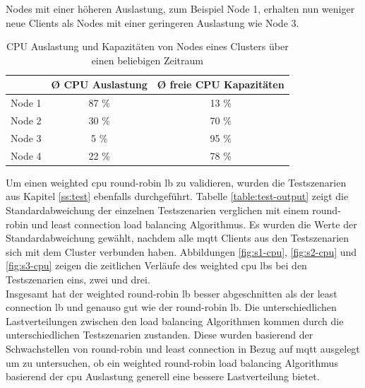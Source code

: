 Nodes mit einer höheren Auslastung, zum Beispiel Node 1, erhalten nun weniger neue Clients als Nodes mit einer geringeren Auslastung wie Node 3.
\\
\begin{table}[h!]
\centering
\renewcommand{\arraystretch}{1.5}
\begin{tabular}{|l|c|c|}
    \hline
    & \textbf{Ø CPU Auslastung} & \textbf{Ø freie CPU Kapazitäten} \\
    \hline
    \hline
    Node 1 & 87 \% & 13 \% \\
    \hline
    Node 2 & 30 \% & 70 \% \\
    \hline
    Node 3 & 5 \% & 95 \% \\
    \hline
    Node 4 & 22 \% & 78 \% \\
    \hline
\end{tabular}
\caption{CPU Auslastung und Kapazitäten von Nodes eines Clusters über einen beliebigen Zeitraum}
\label{table:example-cluster-cpu}
\end{table}
Um einen weighted \ac{cpu} round-robin \acl{lb} zu validieren, wurden die Testszenarien aus Kapitel \ref{ss:test} ebenfalls durchgeführt.
Tabelle \ref{table:test-output} zeigt die Standardabweichung der einzelnen Testszenarien verglichen mit einem round-robin und least connection load balancing Algorithmus.
Es wurden die Werte der Standardabweichung gewählt, nachdem alle \ac{mqtt} Clients aus den Testszenarien sich mit dem Cluster verbunden haben.
Abbildungen \ref{fig:s1-cpu}, \ref{fig:s2-cpu} und \ref{fig:s3-cpu} zeigen die zeitlichen Verläufe des weighted \ac{cpu} \aclp{lb} bei den Testszenarien eins, zwei und drei.
\\
Insgesamt hat der weighted round-robin \ac{lb} besser abgeschnitten als der least connection \ac{lb} und genauso gut wie der round-robin \ac{lb}. Die unterschiedlichen Lastverteilungen zwischen den load balancing Algorithmen kommen durch die unterschiedlichen Testszenarien zustanden. Diese wurden basierend der Schwachstellen von round-robin und least connection in Bezug auf \ac{mqtt} ausgelegt um zu untersuchen, ob ein weighted round-robin load balancing Algorithmus basierend der \ac{cpu} Auslastung generell eine bessere Lastverteilung bietet.
